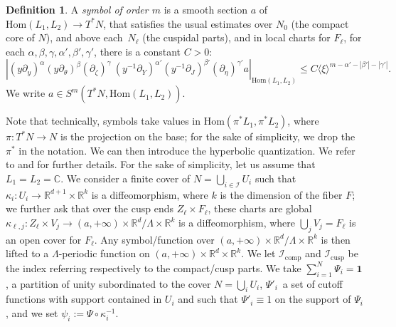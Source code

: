 \documentclass[JEP,XML,SOM,Unicode,NoFloatCountersInSection]{cedram}
\newcommand{\C}{\mathbb{C}}
\newcommand{\R}{\mathbb{R}}
\newcommand{\mc}{\mathcal}
\theoremstyle{plain}
\theoremstyle{definition}
\newtheorem{definition}{Definition}[section]
\begin{document}
\begin{definition}
A \emph{symbol of order $m$} is a smooth section $a$ of $\mathrm{Hom}(L_1,L_2)\to T^\ast N$, that satisfies the usual estimates over $N_0$ (the compact core of $N$), and above each~$N_\ell$ (the cuspidal parts), and in local charts for $F_\ell$, for each $\alpha,\beta,\gamma,\alpha',\beta',\gamma'$, there is a constant $C>0$:
\[
\left|(y\partial_y)^\alpha (y\partial_\theta)^\beta (\partial_\zeta)^\gamma \ (y^{-1}\partial_Y)^{\alpha'}(y^{-1}\partial_J)^{\beta'} (\partial_\eta)^{\gamma'} a \right|_{\mathrm{Hom}(L_1,L_2)} \leq C \langle \xi \rangle^{m - \alpha' - |\beta'| - |\gamma'|}.
\]
We write $a\in S^m(T^\ast N, \mathrm{Hom}(L_1,L_2))$.
\end{definition}

Note that technically, symbols take values in $\mathrm{Hom}(\pi^*L_1,\pi^*L_2)$, where \hbox{$\pi : T^*N \!\to\! N$} is the projection on the base; for the sake of simplicity, we drop the $\pi^*$ in the notation. We can then introduce the hyperbolic quantization. We refer to \cite{Bonthonneau-16} and \cite[App.]{Bonthonneau-Weich-17} for further details. For the sake of simplicity, let us assume that $L_1 = L_2 = \C$. We consider a finite cover of $N = \bigcup_{i \in \mc{I}} U_i$ such that $\kappa_i : U_i \to \R^{d+1} \times \R^k$ is a diffeomorphism, where $k$ is the dimension of the fiber $F$; we further ask that over the cusp ends $Z_\ell \times F_\ell$, these charts are global \ie $\kappa_{\ell,j} : Z_\ell \times V_j \to (a,+\infty) \times \R^d/\Lambda \times \R^k$ is a diffeomorphism, where $\bigcup_j V_j = F_{\ell}$ is an open cover for $F_\ell$. Any symbol/function over $(a,+\infty) \times \R^d/\Lambda \times \R^k$ is then lifted to a $\Lambda$-periodic function on $(a,+\infty) \times \R^d \times \R^k$. We let $\mc{I}_{\mathrm{comp}}$ and $\mc{I}_{\mathrm{cusp}}$ be the index referring respectively to the compact/cusp parts. We take $\sum_{i=1}^N \Psi_i = \mathbf{1}$, a partition of unity subordinated to the cover $N=\bigcup_i U_i$, $\Psi'_i$~a set of cutoff functions with support contained in $U_i$ and such that $\Psi'_i \equiv 1$ on the support of $\Psi_i$, and we set $\psi_i := \Psi \circ \kappa_i^{-1}$.
\end{document}
